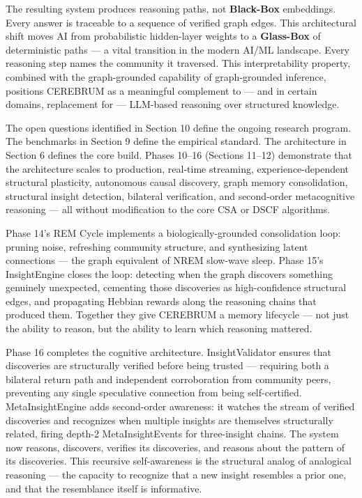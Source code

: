 \documentclass[10pt,journal,compsoc]{IEEEtran}
\begin{document}
The resulting system produces reasoning paths, not \textbf{Black-Box} embeddings. Every
answer is traceable to a sequence of verified graph edges. This archi\-tectural shift 
moves AI from proba\-bilistic hidden-layer weights to a \textbf{Glass-Box} of deter\-ministic 
paths — a vital transition in the modern AI/ML landscape. Every reasoning step names the community it traversed. This inter\-pretability property, combined with the graph-grounded capability of graph-grounded inference, positions CEREBRUM as a meaningful complement to — and in certain domains, replacement for — LLM-based reasoning over structured knowledge.

The open questions identified in Section 10 define the ongoing research program. The benchmarks in Section 9 define the empirical standard. The archi\-tecture in Section 6 defines the core build. Phases 10–16 (Sections 11–12) demonstrate that the archi\-tecture scales to production, real-time streaming, experience-dependent structural plasticity, autonomous causal discovery, graph memory conso\-lidation, structural insight detection, bilateral verif\-ication, and second-order metac\-ognitive reasoning — all without modif\-ication to the core CSA or DSCF algorithms.

Phase 14's REM Cycle implements a biolo\-gically-grounded conso\-lidation loop: pruning noise, refreshing community structure, and synth\-esizing latent connections — the graph equivalent of NREM slow-wave sleep. Phase 15's InsightEngine closes the loop: detecting when the graph discovers something genuinely unexpected, cementing those discoveries as high-confidence structural edges, and propagating Hebbian rewards along the reasoning chains that produced them. Together they give CEREBRUM a memory lifecycle — not just the ability to reason, but the ability to learn which reasoning mattered.

Phase 16 completes the cognitive archi\-tecture. InsightValidator ensures that discoveries are struc\-turally verified before being trusted — requiring both a bilateral return path and independent corro\-boration from community peers, preventing any single speculative connection from being self-certified. MetaInsightEngine adds second-order awareness: it watches the stream of verified discoveries and recognizes when multiple insights are themselves struc\-turally related, firing depth-2 MetaInsightEvents for three-insight chains. The system now reasons, discovers, verifies its discoveries, and reasons about the pattern of its discoveries. This recursive self-awareness is the structural analog of analogical reasoning — the capacity to recognize that a new insight resembles a prior one, and that the resemblance itself is informative.
\end{document}
